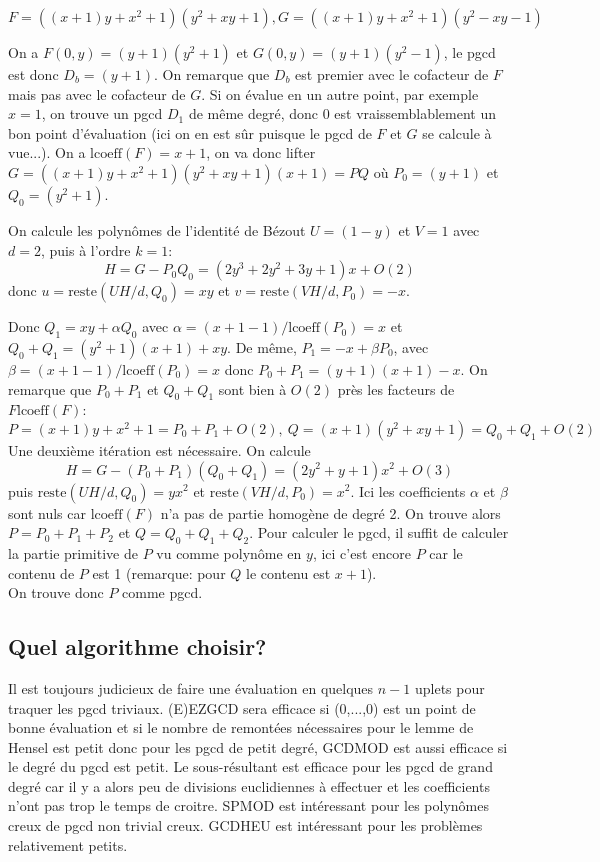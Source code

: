 \documentclass[a4paper,11pt]{article}
\begin{document}
$F = (( x + 1 ) y + x^2 + 1 ) ( y^2 + x y + 1 ), G = (( x + 1 ) y + x^2 + 1 )
( y^2 - x y - 1 )$

On a $F ( 0, y ) = ( y + 1 ) ( y^2 + 1 )$ et $G ( 0, y ) = ( y + 1 ) ( y^2 - 1
)$, le pgcd est donc $D_b = ( y + 1 )$. On remarque que $D_b$ est premier avec
le cofacteur de $F$ mais pas avec le cofacteur de $G$. Si on évalue en un
autre point, par exemple $x = 1$, on trouve un pgcd $D_1$ de même degré, donc
0 est vraissemblablement un bon point d'évaluation (ici on en est sûr puisque
le pgcd de $F$ et $G$ se calcule à vue...). On a $\mbox{lcoeff} ( F ) = x +
1$, on va donc lifter $G = (( x + 1 ) y + x^2 + 1 ) ( y^2 + x y + 1 ) ( x + 1
) = P Q$ où $P_0 = ( y + 1 )$ et $Q_0 = ( y^2 + 1 )$.

On calcule les polynômes de l'identité de Bézout $U = ( 1 - y )$ et $V = 1$
avec $d = 2$, puis à l'ordre $k = 1$:
\[ H = G - P_0 Q_0 = ( 2 y^3 + 2 y^2 + 3 y + 1 ) x + O ( 2 ) \]
donc $u = \mbox{reste} ( U H / d, Q_0 ) = x y$ et $v = \mbox{reste} ( V H / d,
P_0 ) = - x$.

Donc $Q_1 = x y + \alpha Q_0$ avec $\alpha = ( x + 1 - 1 ) / \mbox{lcoeff} (
P_0 ) = x$ et $Q_0 + Q_1 = ( y^2 + 1 ) ( x + 1 ) + x y$. De
même, $P_1 = - x + \beta P_0$, avec $\beta = ( x + 1 - 1 ) / \mbox{lcoeff} (
P_0 ) = x$ donc $P_0 + P_1 = ( y + 1 ) ( x + 1 ) - x$. On remarque que $P_0 +
P_1$ et $Q_0 + Q_1$ sont bien à $O ( 2 )$ près les facteurs de $F
\mbox{lcoeff} ( F )$:
\[ P = ( x + 1 ) y + x^2 + 1 = P_0 + P_1 + O ( 2 ), \ Q = ( x +
   1 ) ( y^2 + x y + 1 ) = Q_0 + Q_1 + O ( 2 ) \]
Une deuxième itération est nécessaire. On calcule
\[ \text{$H = G - ( P_0 + P_1 ) ( Q_0 + Q_1 ) = ( 2 y^2 + y + 1 ) x^2 + O ( 3
   )$} \]
puis $\mbox{reste} ( U H / d, Q_0 ) = y x^2$ et $\mbox{reste} ( V H / d, P_0 )
= x^2$. Ici les coefficients $\alpha$ et $\beta$ sont nuls car $\mbox{lcoeff}
( F )$ n'a pas de partie homogène de degré 2. On trouve alors $P = P_0 + P_1 +
P_2$ et $Q = Q_0 + Q_1 + Q_2$. Pour calculer le pgcd, il suffit de calculer la
partie primitive de $P$ vu comme polynôme en $y$, ici c'est encore $P$ car le
contenu de $P$ est 1 (remarque: pour $Q$ le contenu est $x + 1$).\\
On trouve donc $P$ comme pgcd.

\subsection{Quel algorithme choisir?}

Il est toujours judicieux de faire une évaluation en quelques $n - 1$ uplets
pour traquer les pgcd triviaux. (E)EZGCD sera efficace si (0,...,0) est un
point de bonne évaluation et si le nombre de remontées nécessaires pour le
lemme de Hensel est petit donc pour les pgcd de petit degré, GCDMOD est aussi
efficace si le degré du pgcd est petit. Le sous-résultant est efficace pour
les pgcd de grand degré car il y a alors peu de divisions euclidiennes à
effectuer et les coefficients n'ont pas trop le temps de croitre. SPMOD est
intéressant pour les polynômes creux de pgcd non trivial creux. GCDHEU est
intéressant pour les problèmes relativement petits.
\end{document}
